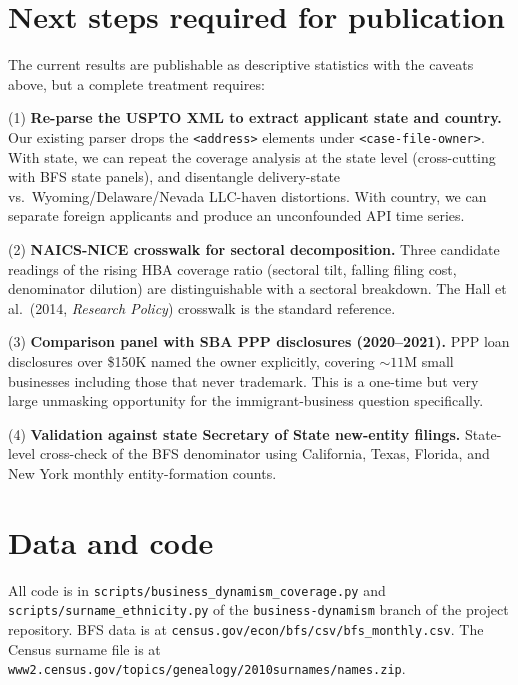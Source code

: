 \documentclass[11pt]{article}
\begin{document}
\section{Next steps required for publication}

The current results are publishable as descriptive statistics with
the caveats above, but a complete treatment requires:

(1) \textbf{Re-parse the USPTO XML to extract applicant state and
country.} Our existing parser drops the \texttt{<address>} elements
under \texttt{<case-file-owner>}. With state, we can repeat the
coverage analysis at the state level (cross-cutting with BFS state
panels), and disentangle delivery-state vs.\ Wyoming/Delaware/Nevada
LLC-haven distortions. With country, we can separate foreign
applicants and produce an unconfounded API time series.

(2) \textbf{NAICS-NICE crosswalk for sectoral decomposition.}
Three candidate readings of the rising HBA coverage ratio (sectoral
tilt, falling filing cost, denominator dilution) are distinguishable
with a sectoral breakdown. The Hall et al.\ (2014, \emph{Research
Policy}) crosswalk is the standard reference.

(3) \textbf{Comparison panel with SBA PPP disclosures (2020--2021).}
PPP loan disclosures over \$150K named the owner explicitly,
covering $\sim 11$M small businesses including those that never
trademark. This is a one-time but very large unmasking opportunity
for the immigrant-business question specifically.

(4) \textbf{Validation against state Secretary of State new-entity
filings.} State-level cross-check of the BFS denominator using
California, Texas, Florida, and New York monthly entity-formation
counts.

\section*{Data and code}
All code is in \texttt{scripts/business\_dynamism\_coverage.py} and
\texttt{scripts/surname\_ethnicity.py} of the
\texttt{business-dynamism} branch of the project repository. BFS
data is at
\texttt{census.gov/econ/bfs/csv/bfs\_monthly.csv}. The Census surname
file is at
\texttt{www2.census.gov/topics/genealogy/2010surnames/names.zip}.
\end{document}
